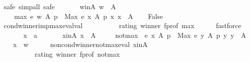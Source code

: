 \begin{isabellebody}
%
\isadelimproof
%
\endisadelimproof
%
\isatagproof
{}\isamarkupfalse%
\ {\isacharparenleft}{\kern0pt}safe{\isacharcomma}{\kern0pt}\ simp{\isacharunderscore}{\kern0pt}all{\isacharcomma}{\kern0pt}\ safe{\isacharparenright}{\kern0pt}\isanewline
\ \ \isamarkupfalse%
\isanewline
\ \ \ \ w{\isacharunderscore}{\kern0pt}in{\isacharunderscore}{\kern0pt}A{\isacharcolon}{\kern0pt}\ {\isachardoublequoteopen}w\ {\isasymin}\ A{\isachardoublequoteclose}\ \isanewline
\ \ \ \ max{\isacharcolon}{\kern0pt}\ {\isachardoublequoteopen}e\ w\ A\ p\ {\isacharless}{\kern0pt}\ Max\ {\isacharbraceleft}{\kern0pt}e\ x\ A\ p\ {\isacharbar}{\kern0pt}x{\isachardot}{\kern0pt}\ x\ {\isasymin}\ A{\isacharbraceright}{\kern0pt}{\isachardoublequoteclose}\isanewline
\ \ \isamarkupfalse%
\ {\isachardoublequoteopen}False{\isachardoublequoteclose}\isanewline
\ \ \ \ \isamarkupfalse%
\ cond{\isacharunderscore}{\kern0pt}winner{\isacharunderscore}{\kern0pt}imp{\isacharunderscore}{\kern0pt}max{\isacharunderscore}{\kern0pt}eval{\isacharunderscore}{\kern0pt}val\isanewline
\ \ \ \ \ \ \ \ \ \ rating\ winner\ f{\isacharunderscore}{\kern0pt}prof\ max\isanewline
\ \ \ \ \isamarkupfalse%
\ fastforce\isanewline
{}\isamarkupfalse%
\isanewline
\ \ \isamarkupfalse%
\isanewline
\ \ \ \ x\ {\isacharcolon}{\kern0pt}{\isacharcolon}{\kern0pt}\ {\isachardoublequoteopen}{\isacharprime}{\kern0pt}a{\isachardoublequoteclose}\isanewline
\ \ \isamarkupfalse%
\isanewline
\ \ \ \ x{\isacharunderscore}{\kern0pt}in{\isacharunderscore}{\kern0pt}A{\isacharcolon}{\kern0pt}\ {\isachardoublequoteopen}x\ {\isasymin}\ A{\isachardoublequoteclose}\ \isanewline
\ \ \ \ not{\isacharunderscore}{\kern0pt}max{\isacharcolon}{\kern0pt}\ {\isachardoublequoteopen}{\isasymnot}\ e\ x\ A\ p\ {\isacharless}{\kern0pt}\ Max\ {\isacharbraceleft}{\kern0pt}e\ y\ A\ p\ {\isacharbar}{\kern0pt}y{\isachardot}{\kern0pt}\ y\ {\isasymin}\ A{\isacharbraceright}{\kern0pt}{\isachardoublequoteclose}\isanewline
\ \ \isamarkupfalse%
\ {\isachardoublequoteopen}x\ {\isacharequal}{\kern0pt}\ w{\isachardoublequoteclose}\isanewline
\ \ \ \ \isamarkupfalse%
\ non{\isacharunderscore}{\kern0pt}cond{\isacharunderscore}{\kern0pt}winner{\isacharunderscore}{\kern0pt}not{\isacharunderscore}{\kern0pt}max{\isacharunderscore}{\kern0pt}eval\ x{\isacharunderscore}{\kern0pt}in{\isacharunderscore}{\kern0pt}A\isanewline
\ \ \ \ \ \ \ \ \ \ rating\ winner\ f{\isacharunderscore}{\kern0pt}prof\ not{\isacharunderscore}{\kern0pt}max\isanewline

\end{isabellebody}
